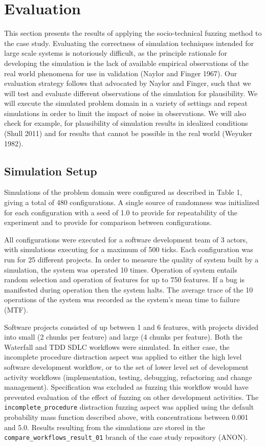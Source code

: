 \documentclass{llncs}
\begin{document}
 


\section{Evaluation}

This section presents the results of applying the socio-technical fuzzing method to the case study.  Evaluating the
correctness of simulation techniques intended for large scale systems is notoriously difficult, as the principle
rationale for developing the simulation is the lack of available empirical observations of the real world phenomena for
use in validation (Naylor and Finger 1967).  Our evaluation strategy follows that advocated by Naylor and Finger, such
that we will test and evaluate different observations of the simulation for plausibility.  We will execute the simulated
problem domain in a variety of settings and repeat simulations in order to limit the impact of noise in observations.
We will also check for example, for plausibility of simulation results in idealized conditions (Shull 2011) and for
results that cannot be possible in the real world (Weyuker 1982).

\subsection{Simulation Setup}

Simulations of the problem domain were configured as described in Table 1, giving a total of 480 configurations.  A
single source of randomness was initialized for each configuration with a seed of 1.0 to provide for repeatability of
the experiment and to provide for comparison between configurations.

All configurations were executed for a software development team of 3 actors, with simulations executing for a maximum
of 500 ticks.  Each configuration was run for 25 different projects.  In order to measure the quality of system built by
a simulation, the system was operated 10 times.  Operation of system entails random selection and operation of features
for up to 750 features.  If a bug is manifested during operation then the system halts.  The average trace of the 10
operations of the system was recorded as the system’s mean time to failure (MTF).

Software projects consisted of up between 1 and 6 features, with projects divided into small (2 chunks per feature) and
large (4 chunks per feature). Both the Waterfall and TDD SDLC workflows were simulated.  In either case, the incomplete
procedure distraction aspect was applied to either the high level software development workflow, or to the set of lower
level set of development activity workflows (implementation, testing, debugging, refactoring and change management).
Specification was excluded as fuzzing this workflow would have prevented evaluation of the effect of fuzzing on other
development activities.  The \lstinline!incomplete_procedure! distraction fuzzing aspect was applied using the default
probability mass function described above, with concentrations between 0.001 and 5.0.  Results resulting from the
simulations are stored in the \lstinline!compare_workflows_result_01! branch of the case study repository (ANON).
\end{document}
